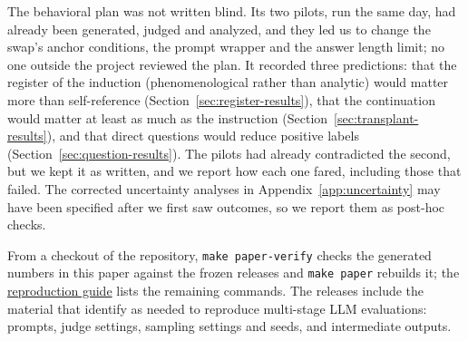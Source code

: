 \documentclass[11pt]{article}
\newcommand{\closeoutartifact}[2]{\href{https://github.com/tdj28/llm_selfref_pre/blob/294da265ee3a08b9ef42343f9461b8d4718b7bc7/#1}{#2}}
\begin{document}
The behavioral plan was not written blind. Its two pilots, run the same day,
had already been generated, judged and analyzed, and they led us to change
the swap's anchor conditions, the prompt wrapper and the answer length limit;
no one outside the project reviewed the plan. It recorded three predictions:
that the register of the induction (phenomenological rather than analytic)
would matter more than self-reference (Section~\ref{sec:register-results}),
that the continuation would matter at least as much as the instruction
(Section~\ref{sec:transplant-results}), and that direct questions would
reduce positive labels (Section~\ref{sec:question-results}). The pilots had
already contradicted the second, but we kept it as written, and we report
how each one fared, including those that failed. The corrected uncertainty
analyses in Appendix~\ref{app:uncertainty} may have been specified after we
first saw outcomes, so we report them as post-hoc checks.

From a checkout of the repository, \texttt{make paper-verify} checks the
generated numbers in this paper against the frozen releases and
\texttt{make paper} rebuilds it; the
\closeoutartifact{docs/REPRODUCTION.md}{reproduction guide} lists the
remaining commands. The releases include the material that
\citet{pattnayak2026reproevalcard} identify as needed to reproduce multi-stage
LLM evaluations: prompts, judge settings, sampling settings and seeds, and
intermediate outputs.
\end{document}
